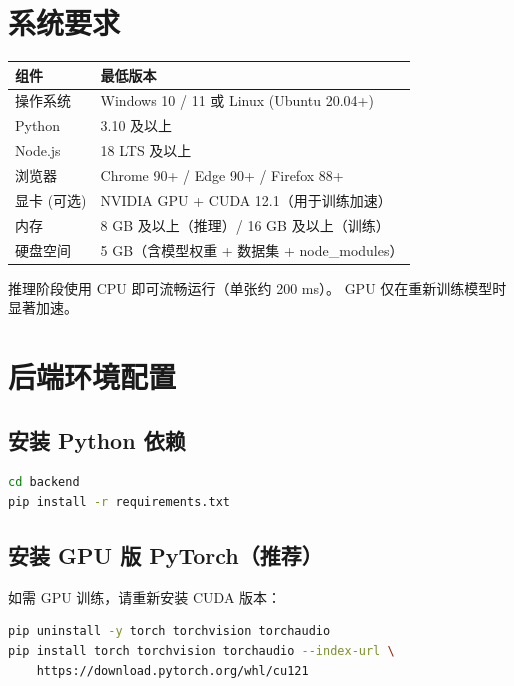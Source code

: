 \documentclass[12pt, a4paper, openany]{ctexbook}
\begin{document}
\section{系统要求}

\begin{center}
\begin{tabular}{ll}
  \toprule
  \textbf{组件} & \textbf{最低版本} \\
  \midrule
  操作系统    & Windows 10 / 11 或 Linux (Ubuntu 20.04+) \\
  Python      & 3.10 及以上 \\
  Node.js     & 18 LTS 及以上 \\
  浏览器      & Chrome 90+ / Edge 90+ / Firefox 88+ \\
  显卡 (可选) & NVIDIA GPU + CUDA 12.1（用于训练加速） \\
  内存        & 8 GB 及以上（推理）/ 16 GB 及以上（训练） \\
  硬盘空间    & 5 GB（含模型权重 + 数据集 + node\_modules） \\
  \bottomrule
\end{tabular}
\end{center}

\begin{tipbox}
推理阶段使用 CPU 即可流畅运行（单张约 200 ms）。
GPU 仅在重新训练模型时显著加速。
\end{tipbox}

\section{后端环境配置}

\subsection{安装 Python 依赖}

\begin{lstlisting}[language=bash]
cd backend
pip install -r requirements.txt
\end{lstlisting}

\subsection{安装 GPU 版 PyTorch（推荐）}

如需 GPU 训练，请重新安装 CUDA 版本：

\begin{lstlisting}[language=bash]
pip uninstall -y torch torchvision torchaudio
pip install torch torchvision torchaudio --index-url \
    https://download.pytorch.org/whl/cu121
\end{lstlisting}
\end{document}
